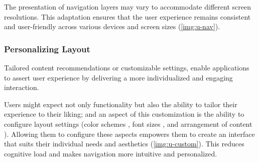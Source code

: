 The presentation of navigation layers may vary to accommodate different screen resolutions. This adaptation 
ensures that the user experience remains consistent and user-friendly across various devices and screen sizes 
(\cref{img:u-nav}).




\subsubsection{Personalizing Layout}

Tailored content recommendations or customizable settings, enable applications to assert user experience by delivering 
a more individualized and engaging interaction.

Users might expect not only functionality but also the ability to tailor their experience to their liking; and an 
aspect of this customization is the ability to configure layout settings (color schemes , font sizes 
, and arrangement of content ). Allowing them to configure these aspects empowers them to 
create an interface that suits their individual needs and aesthetics (\cref{img:u-custom}). This reduces cognitive 
load and makes navigation more intuitive and personalized.

